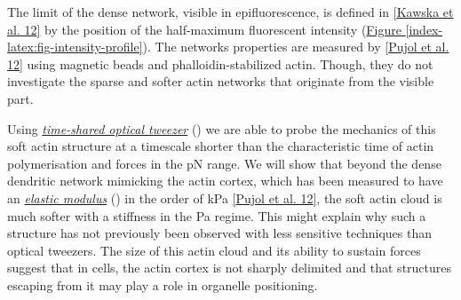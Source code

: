\documentclass[A4paperpaper,11pt,english]{sphinxmanual}
\begin{document}
The limit of the dense network, visible in epifluorescence, is defined in
{\hyperref[index-latex:kawska2012]{{[}Kawska et al. 12{]}}} by the position of the half-maximum fluorescent intensity (\hyperref[index-latex:fig-intensity-profile]{Figure  \ref*{index-latex:fig-intensity-profile}}).
The networks properties are measured by {\hyperref[index-latex:pujol2012]{{[}Pujol et al. 12{]}}} using
magnetic beads and phalloidin-stabilized actin. Though, they do not
investigate the sparse and softer actin networks that originate from the visible
part.

Using {\hyperref[index-latex:time-shared-ot]{\emph{time-shared optical tweezer}}} () we are able to probe
the mechanics of this soft actin structure at a timescale shorter than the
characteristic time of actin polymerisation and forces in the pN range. We will show
that beyond the dense dendritic network mimicking the actin cortex, which has
been measured to have an {\hyperref[index-latex:elastic-modulus]{\emph{elastic modulus}}} () in the order of
kPa {\hyperref[index-latex:pujol2012]{{[}Pujol et al. 12{]}}}, the soft actin cloud is much softer with
a stiffness in the Pa regime.  This might explain why such a
structure has not previously been observed with less sensitive techniques than optical
tweezers. The size of this actin cloud and its ability to sustain forces
suggest that in cells, the actin cortex is not sharply delimited and that
structures escaping from it may play a role in organelle positioning.
\end{document}
